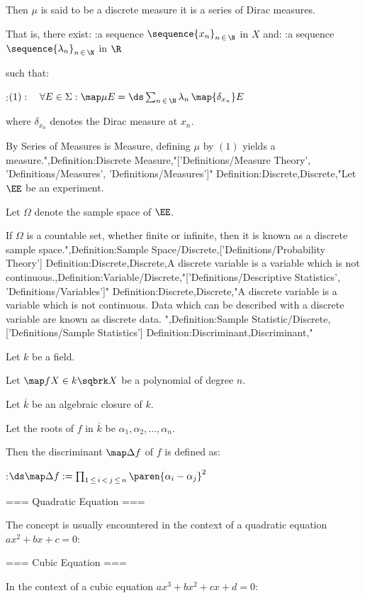 Then $\mu$ is said to be a discrete measure  it is a series of Dirac measures.

That is,  there exist:
:a sequence $\sequence {x_n}_{n \mathop \in \N}$ in $X$
and:
:a sequence $\sequence {\lambda_n}_{n \mathop \in \N}$ in $\R$

such that:

:$(1):\quad \forall E \in \Sigma: \map \mu E = \ds \sum_{n \mathop \in \N} \lambda_n \, \map {\delta_{x_n} } E$

where $\delta_{x_n}$ denotes the Dirac measure at $x_n$.


By Series of Measures is Measure, defining $\mu$ by $(1)$ yields a measure.",Definition:Discrete Measure,"['Definitions/Measure Theory', 'Definitions/Measures', 'Definitions/Measures']"
Definition:Discrete,Discrete,"Let $\EE$ be an experiment.

Let $\Omega$ denote the sample space of $\EE$.


If $\Omega$ is a countable set, whether finite or infinite, then it is known as a discrete sample space.",Definition:Sample Space/Discrete,['Definitions/Probability Theory']
Definition:Discrete,Discrete,A discrete variable is a variable which is not continuous.,Definition:Variable/Discrete,"['Definitions/Descriptive Statistics', 'Definitions/Variables']"
Definition:Discrete,Discrete,"A discrete variable is a variable which is not continuous.
Data which can be described with a discrete variable are known as discrete data.
",Definition:Sample Statistic/Discrete,['Definitions/Sample Statistics']
Definition:Discriminant,Discriminant,"


Let $k$ be a field.

Let $\map f X \in k \sqbrk X$ be a polynomial of degree $n$.

Let $\overline k$ be an algebraic closure of $k$.

Let the roots of $f$ in $\overline k$ be $\alpha_1, \alpha_2, \ldots, \alpha_n$.


Then the discriminant $\map \Delta f$ of $f$ is defined as:

:$\ds \map \Delta f := \prod_{1 \mathop \le i \mathop < j \mathop \le n} \paren {\alpha_i - \alpha_j}^2$


=== Quadratic Equation ===

The concept is usually encountered in the context of a quadratic equation $a x^2 + b x + c = 0$:


=== Cubic Equation ===

In the context of a cubic equation $a x^3 + b x^2 + c x + d = 0$:

